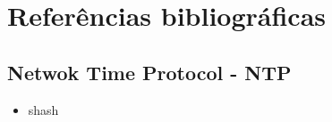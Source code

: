 \newpage
\section* {Referências bibliográficas}

\subsection* {Netwok Time Protocol - NTP}
\begin {itemize}
  \item shash
\end{itemize}